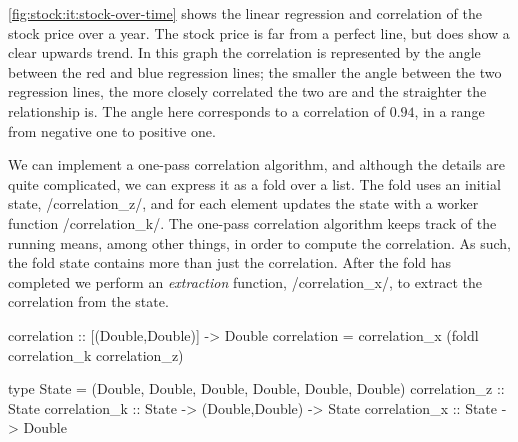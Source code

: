 

\autoref{fig:stock:it:stock-over-time} shows the linear regression and correlation of the stock price over a year.
The stock price is far from a perfect line, but does show a clear upwards trend.
In this graph the correlation is represented by the angle between the red and blue regression lines; the smaller the angle between the two regression lines, the more closely correlated the two are and the straighter the relationship is.
The angle here corresponds to a correlation of $0.94$, in a range from negative one to positive one.


We can implement a one-pass correlation algorithm, and although the details are quite complicated, we can express it as a fold over a list.
The fold uses an initial state, \Hs/correlation_z/, and for each element updates the state with a worker function \Hs/correlation_k/.
The one-pass correlation algorithm keeps track of the running means, among other things, in order to compute the correlation.
As such, the fold state contains more than just the correlation.
After the fold has completed we perform an \emph{extraction} function, \Hs/correlation_x/, to extract the correlation from the state.

\begin{haskell}
correlation :: [(Double,Double)] -> Double
correlation = correlation_x (foldl correlation_k correlation_z)

type State = (Double, Double, Double, Double, Double, Double)
correlation_z :: State
correlation_k :: State -> (Double,Double) -> State
correlation_x :: State -> Double
\end{haskell}

